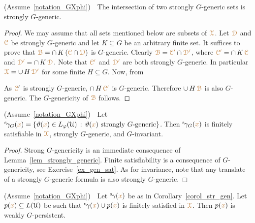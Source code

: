 \begin{lemma}\label{lem_strongly_generic}
  (Assume~\ref{notation_GXphi})\ \  
  The intersection of two strongly $G$-generic sets is strongly $G$-generic.
\end{lemma}

\begin{proof}
  We may assume that all sets mentioned below are subsets of ${\color{brown}\EuScript X}$.
  Let ${\color{brown}\EuScript D}$ and ${\color{brown}\EuScript C}$ be strongly $G$-generic and let $K\subseteq G$ be an arbitrary finite set.
  It suffices to prove that ${\color{brown}\EuScript B}=\cap\, K\,({\color{brown}\EuScript C}\cap{\color{brown}\EuScript D})$ is $G$-generic. 
  Clearly ${\color{brown}\EuScript B}={\color{brown}\EuScript C'}\cap{\color{brown}\EuScript D'}$, where ${\color{brown}\EuScript C'}=\cap\, K\,{\color{brown}\EuScript C}$ and ${\color{brown}\EuScript D'}=\cap\, K\,{\color{brown}\EuScript D}$.
  Note that ${\color{brown}\EuScript C'}$ and ${\color{brown}\EuScript D'}$ are both strongly $G$-generic.
  In particular ${\color{brown}\EuScript X}=\cup\,H\,\color{brown}\EuScript D'$ for some finite $H\subseteq G$.
  Now, from
  

  
  
  
  As ${{\color{brown}\EuScript C}'}$ is strongly $G$-generic, $\cap\, H\,{\color{brown}\EuScript C'}$ is $G$-generic.
  Therefore $\cup\,H\,{\color{brown}\EuScript B}$ is also $G$-generic.
  The $G$-genericity of ${\color{brown}\EuScript B}$ follows.
\end{proof}

\begin{corollary}\label{corol_str_gen}
  (Assume~\ref{notation_GXphi})\ \  
  Let ${}^{\rm s}\kern-.2ex\gamma_G({\color{brown} x})=\{\vartheta({\color{brown} x})\in L_\varphi(\EuScript U)\,:\, \vartheta({\color{brown} x})\textrm{ strongly $G$-generic}\}$.
  Then ${}^{\rm s}\kern-.2ex\gamma_G({\color{brown} x})$ is finitely satisfiable in ${\color{brown}\EuScript X}$, strongly $G$-generic, and $G$-invariant.
\end{corollary}

\begin{proof}
  Strong $G$-genericity is an immediate consequence of Lemma~\ref{lem_strongly_generic}.
  Finite satisfiability is a consequence of $G$-genericity, see Exercise~\ref{ex_gen_sat}.
  As for invariance, note that any translate of a strongly $G$-generic formula is also strongly $G$-generic.
\end{proof}

\begin{corollary}\label{corol_q_w_pers}
  (Assume~\ref{notation_GXphi})\ \  
  Let ${}^{\rm s}\kern-.2ex\gamma({\color{brown} x})$ be as in Corollary~\ref{corol_str_gen}.
  Let $p({\color{brown} x})\subseteq L(\EuScript U)$ be such that ${}^{\rm s}\kern-.2ex\gamma({\color{brown} x})\cup p({\color{brown} x})$ is finitely satisfied in ${\color{brown}\EuScript X}$.
  Then $p({\color{brown} x})$ is weakly $G$-persistent.
\end{corollary}

